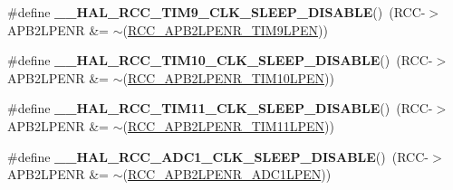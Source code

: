 \begin{DoxyCompactItemize}
\item 
\hypertarget{group___r_c_c___peripheral___clock___sleep___enable___disable_ga531cefe824de1fa7461b34030d30d75f}{\#define {\bfseries \-\_\-\-\_\-\-H\-A\-L\-\_\-\-R\-C\-C\-\_\-\-T\-I\-M9\-\_\-\-C\-L\-K\-\_\-\-S\-L\-E\-E\-P\-\_\-\-D\-I\-S\-A\-B\-L\-E}()~(R\-C\-C-\/$>$A\-P\-B2\-L\-P\-E\-N\-R \&= $\sim$(\hyperlink{group___peripheral___registers___bits___definition_ga91b882f3dc2b939a53ed3f4caa537de1}{R\-C\-C\-\_\-\-A\-P\-B2\-L\-P\-E\-N\-R\-\_\-\-T\-I\-M9\-L\-P\-E\-N}))}\label{group___r_c_c___peripheral___clock___sleep___enable___disable_ga531cefe824de1fa7461b34030d30d75f}

\item 
\hypertarget{group___r_c_c___peripheral___clock___sleep___enable___disable_ga884747bf8ec12a16a37c512c6979fb4d}{\#define {\bfseries \-\_\-\-\_\-\-H\-A\-L\-\_\-\-R\-C\-C\-\_\-\-T\-I\-M10\-\_\-\-C\-L\-K\-\_\-\-S\-L\-E\-E\-P\-\_\-\-D\-I\-S\-A\-B\-L\-E}()~(R\-C\-C-\/$>$A\-P\-B2\-L\-P\-E\-N\-R \&= $\sim$(\hyperlink{group___peripheral___registers___bits___definition_gae7999e2ebeb1300d0cf6a59ad92c41b6}{R\-C\-C\-\_\-\-A\-P\-B2\-L\-P\-E\-N\-R\-\_\-\-T\-I\-M10\-L\-P\-E\-N}))}\label{group___r_c_c___peripheral___clock___sleep___enable___disable_ga884747bf8ec12a16a37c512c6979fb4d}

\item 
\hypertarget{group___r_c_c___peripheral___clock___sleep___enable___disable_gaf9c48fd8cd99db0e44d5427afe10c383}{\#define {\bfseries \-\_\-\-\_\-\-H\-A\-L\-\_\-\-R\-C\-C\-\_\-\-T\-I\-M11\-\_\-\-C\-L\-K\-\_\-\-S\-L\-E\-E\-P\-\_\-\-D\-I\-S\-A\-B\-L\-E}()~(R\-C\-C-\/$>$A\-P\-B2\-L\-P\-E\-N\-R \&= $\sim$(\hyperlink{group___peripheral___registers___bits___definition_gad43fcaa4f4d6fb2b590a6ffee31f8c94}{R\-C\-C\-\_\-\-A\-P\-B2\-L\-P\-E\-N\-R\-\_\-\-T\-I\-M11\-L\-P\-E\-N}))}\label{group___r_c_c___peripheral___clock___sleep___enable___disable_gaf9c48fd8cd99db0e44d5427afe10c383}

\item 
\hypertarget{group___r_c_c___peripheral___clock___sleep___enable___disable_ga9534ddc24145ef6335d76b35632b7fe2}{\#define {\bfseries \-\_\-\-\_\-\-H\-A\-L\-\_\-\-R\-C\-C\-\_\-\-A\-D\-C1\-\_\-\-C\-L\-K\-\_\-\-S\-L\-E\-E\-P\-\_\-\-D\-I\-S\-A\-B\-L\-E}()~(R\-C\-C-\/$>$A\-P\-B2\-L\-P\-E\-N\-R \&= $\sim$(\hyperlink{group___peripheral___registers___bits___definition_ga126a8791f77cecc599e32d2c882a4dab}{R\-C\-C\-\_\-\-A\-P\-B2\-L\-P\-E\-N\-R\-\_\-\-A\-D\-C1\-L\-P\-E\-N}))}\label{group___r_c_c___peripheral___clock___sleep___enable___disable_ga9534ddc24145ef6335d76b35632b7fe2}


\end{DoxyCompactItemize}

